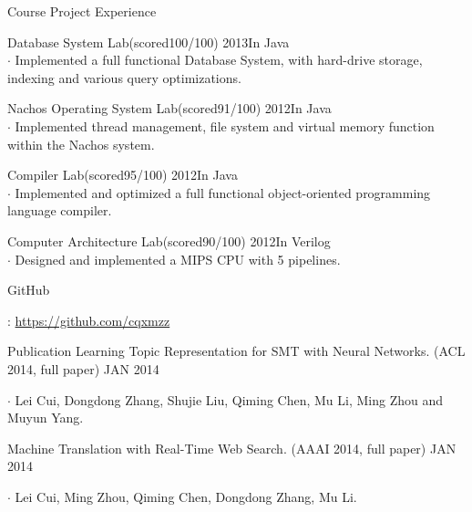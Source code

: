 \documentclass{resume} %
\begin{document}

\begin{rSection}{Course Project Experience}
\begin{rSubsection}{Database System Lab}{(scored100/100) 2013}{In Java}
\\ $\cdot$ Implemented a full functional Database System, with hard-drive storage, indexing and various query optimizations.  
\end{rSubsection}
\begin{rSubsection}{Nachos Operating System Lab}{(scored91/100) 2012}{In Java}
\\ $\cdot$ Implemented thread management, file system and virtual memory function within the Nachos system.
\end{rSubsection}
\begin{rSubsection}{Compiler Lab}{(scored95/100) 2012}{In Java}
\\ $\cdot$ Implemented and optimized a full functional object-oriented programming language compiler.
\end{rSubsection}
\begin{rSubsection}{Computer Architecture Lab}{(scored90/100) 2012}{In Verilog}
\\ $\cdot$ Designed and implemented a MIPS CPU with 5 pipelines.
\end{rSubsection}
\begin{bf}GitHub\end{bf}: \href{https://github.com/cqxmzz?tab=repositories}{https://github.com/cqxmzz}

\end{rSection}
%

\begin{rSection}{Publication}
Learning Topic Representation for SMT with Neural Networks. (ACL 2014, full paper) \hfill JAN 2014 \\
\begin{small}
$\cdot$ Lei Cui, Dongdong Zhang, Shujie Liu, Qiming Chen, Mu Li, Ming Zhou and Muyun Yang.\\
\end{small}
Machine Translation with Real-Time Web Search. (AAAI 2014, full paper) \hfill JAN 2014\\
\begin{small}
$\cdot$ Lei Cui, Ming Zhou, Qiming Chen, Dongdong Zhang, Mu Li.
\end{small}
\end{rSection}
\end{document}
